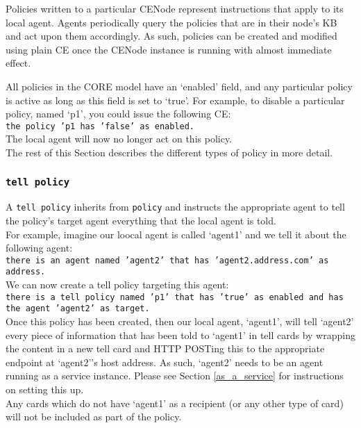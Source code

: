 \documentclass{scrartcl}
\begin{document}
Policies written to a particular CENode represent instructions that apply to its local agent. Agents periodically query the policies that are in their node's KB and act upon them accordingly. As such, policies can be created and modified using plain CE once the CENode instance is running with almost immediate effect.

All policies in the CORE model have an `enabled' field, and any particular policy is active as long as this field is set to `true'. For example, to disable a particular policy, named `p1', you could issue the following CE:\\
\texttt{the policy 'p1 has 'false' as enabled.}\\
The local agent will now no longer act on this policy.\\

The rest of this Section describes the different types of policy in more detail.

\subsubsection{\texttt{tell policy}}
A \texttt{tell policy} inherits from \texttt{policy} and instructs the appropriate agent to tell the policy's target agent everything that the local agent is told.\\

For example, imagine our loocal agent is called `agent1' and we tell it about the following agent:\\
\texttt{there is an agent named 'agent2' that has 'agent2.address.com' as address.}\\
We can now create a tell policy targeting this agent:\\
\texttt{there is a tell policy named 'p1' that has 'true' as enabled and has the agent 'agent2' as target.}\\

Once this policy has been created, then our local agent, `agent1', will tell `agent2' every piece of information that has been told to `agent1' in tell cards by wrapping the content in a new tell card and HTTP POSTing this to the appropriate endpoint at `agent2''s host address. As such, `agent2' needs to be an agent running as a service instance. Please see Section \ref{as_a_service} for instructions on setting this up.\\

Any cards which do not have `agent1' as a recipient (or any other type of card) will not be included as part of the policy.
\end{document}

